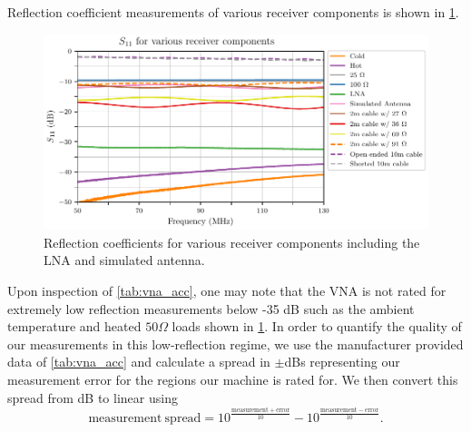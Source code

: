 Reflection coefficient measurements of various receiver components is shown in \cref{fig:s11_meas}. 
\begin{figure}
    \centering
    \includegraphics[width=\columnwidth]{s11_meas}
    \caption{Reflection coefficients for various receiver components including the LNA and simulated antenna.}
    \label{fig:s11_meas}
\end{figure}
Upon inspection of \cref{tab:vna_acc}, one may note that the VNA is not rated for extremely low reflection measurements below -35 dB such as the ambient temperature and heated $50\Omega$ loads shown in \cref{fig:s11_meas}. In order to quantify the quality of our measurements in this low-reflection regime, we use the manufacturer provided data of \cref{tab:vna_acc} and calculate a spread in $\pm$dBs representing our measurement error for the regions our machine is rated for. We then convert this spread from dB to linear using
\begin{equation}
    \mathrm{measurement \ spread} = 10^{\frac{\mathrm{measurement} + \mathrm{error}}{10}} - 10^{\frac{\mathrm{measurement} - \mathrm{error}}{10}}.
    \label{eq:vna_spread}
\end{equation}
